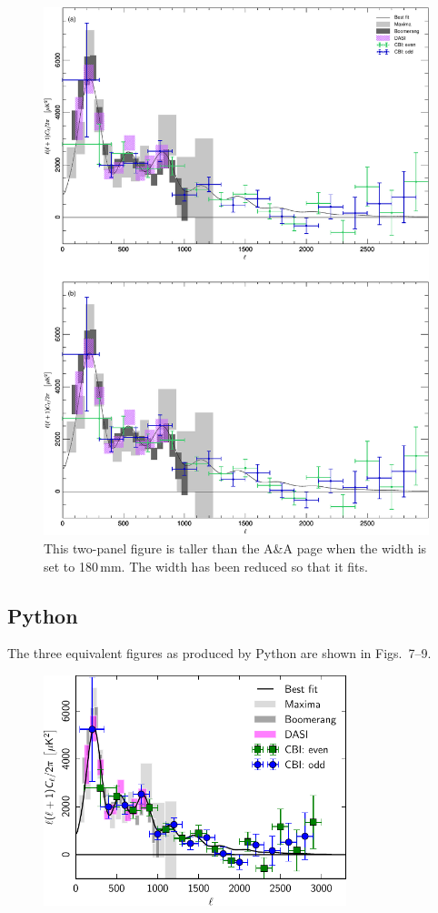 \documentclass[traditabstract]{aa}
\begin{document}
\begin{figure}
\includegraphics[width=16.8cm]{PlanckFig_lineplot_IDL_2x180mm.pdf}
\caption{This two-panel figure is taller than the A\&A page when the width is set to 180\,mm.  The width has been reduced so that it fits.}%
\end{figure}

\clearpage





\subsection{Python}

The three equivalent figures as produced by Python are shown in Figs.~7--9.


\begin{figure}[ht]
\includegraphics[width=8.8cm]{PlanckFig_lineplot_python_88mm.pdf}
\caption{\fcaption} 
\end{figure}
\end{document}
